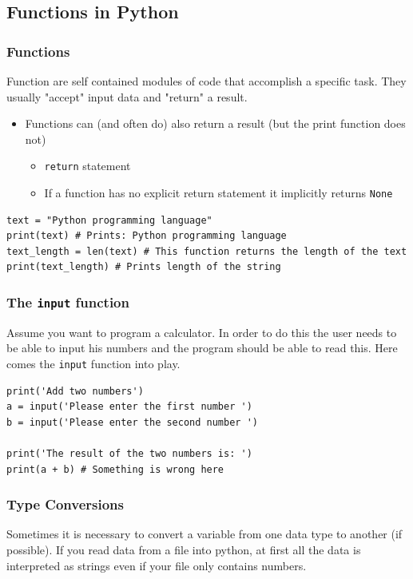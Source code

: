\documentclass[10pt, a4paper]{beamer} %
\begin{document}
\subsection{Functions in Python} %
\label{sub:functions}
\begin{frame}\frametitle{Functions}
Function are self contained modules of code that accomplish a specific task. They usually "accept" input data and "return" a result.
\begin{itemize}
    \begin{lstlisting}
name = "Some name"
print(name) # Some name is used inside the print function -> the print function accepts the input and prints it to the console
    \end{lstlisting}
    \item Functions can (and often do) also return a result (but the print function does not)
    \begin{itemize}
        \item \lstinline!return! statement
        \item If a function has no explicit return statement it implicitly returns \lstinline!None!
    \end{itemize}
\end{itemize}

\begin{examples}
  \begin{lstlisting}
text = "Python programming language"
print(text) # Prints: Python programming language
text_length = len(text) # This function returns the length of the text
print(text_length) # Prints length of the string
  \end{lstlisting}
\end{examples}
\framebreak
\frametitle{The \lstinline!input! function}

Assume you want to program a calculator.
In order to do this the user needs to be able to input his numbers and the program should be able to read this.
Here comes the \lstinline!input! function into play.

\begin{lstlisting}
print('Add two numbers')
a = input('Please enter the first number ')
b = input('Please enter the second number ')

print('The result of the two numbers is: ')
print(a + b) # Something is wrong here
\end{lstlisting}


\framebreak
\frametitle{Type Conversions}
Sometimes it is necessary to convert a variable from one data type to another (if possible). If you 
read data from a file into python, at first all the data is interpreted as strings even if your file only
contains numbers.


\end{frame}
\end{document}
